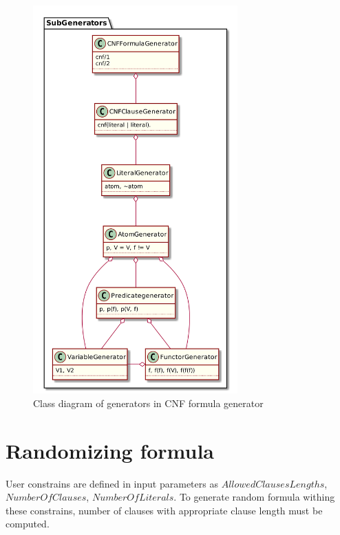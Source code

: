 \begin{figure}[h]
\begin{centering}
  \includegraphics[width=0.7\textwidth]{logic-formula-generator/fol/cnf_signature_generators.png}
  \caption{Class diagram of generators in CNF formula generator}
  \label{pic:fol_signature_generator_class_diagram}
\end{centering}
\end{figure}

\section{Randomizing formula}
\label{sec:RandomizeFormula}

User constrains are defined in input parameters as $AllowedClausesLengths$, $NumberOfClauses$, $NumberOfLiterals$. To generate random formula withing these constrains, number of clauses with appropriate clause length must be computed.

